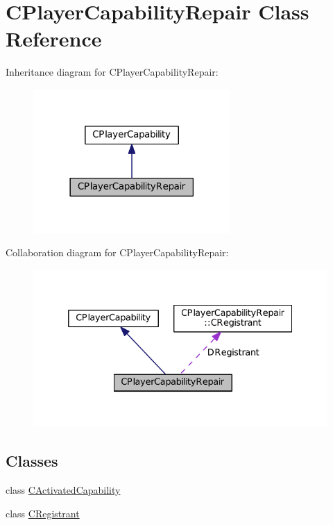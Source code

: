 \hypertarget{classCPlayerCapabilityRepair}{}\section{C\+Player\+Capability\+Repair Class Reference}
\label{classCPlayerCapabilityRepair}


Inheritance diagram for C\+Player\+Capability\+Repair\+:\nopagebreak
\begin{figure}[H]
\begin{center}
\leavevmode
\includegraphics[width=213pt]{classCPlayerCapabilityRepair__inherit__graph}
\end{center}
\end{figure}


Collaboration diagram for C\+Player\+Capability\+Repair\+:\nopagebreak
\begin{figure}[H]
\begin{center}
\leavevmode
\includegraphics[width=332pt]{classCPlayerCapabilityRepair__coll__graph}
\end{center}
\end{figure}
\subsection*{Classes}
\begin{DoxyCompactItemize}
\item 
class \hyperlink{classCPlayerCapabilityRepair_1_1CActivatedCapability}{C\+Activated\+Capability}
\item 
class \hyperlink{classCPlayerCapabilityRepair_1_1CRegistrant}{C\+Registrant}
\end{DoxyCompactItemize}
